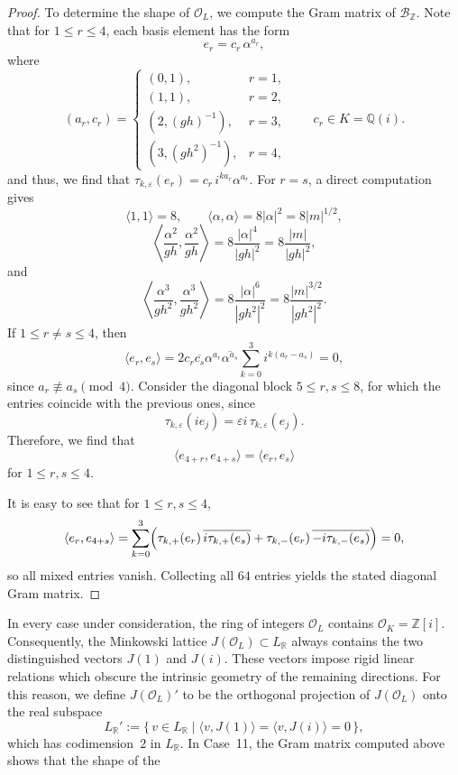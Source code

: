 \documentclass{amsart}
\newcommand{\Q}{\mathbb{Q}}
\newcommand{\R}{\mathbb{R}}
\newcommand{\Z}{\mathbb{Z}}
\newcommand{\cO}{\mathcal{O}}
\theoremstyle{plain}
\theoremstyle{definition}
\theoremstyle{remark}
\numberwithin{equation}{section}
\begin{document}
\begin{proof}
To determine the shape of $\cO_L$, we compute the Gram matrix of $\mathcal B_{\Z}$. Note that for $1\le r\le4$, each basis element has the form
\[
e_r=c_r\,\alpha^{a_r},
\]
where
\[
(a_r,c_r)=
\begin{cases}
(0,1), & r=1,\\
(1,1), & r=2,\\
(2,(gh)^{-1}), & r=3,\\
(3,(gh^2)^{-1}), & r=4,
\end{cases}
\qquad c_r\in K=\Q(i).
\]
and thus, we find that $\tau_{k,\varepsilon}(e_r)
=
c_r\,i^{k a_r}\alpha^{a_r}$. For $r=s$, a direct computation gives
\[
\langle 1,1\rangle=8,
\qquad
\langle \alpha,\alpha\rangle=8|\alpha|^2=8|m|^{1/2},
\]
\[
\left\langle \frac{\alpha^2}{gh},\frac{\alpha^2}{gh}\right\rangle
=
8\frac{|\alpha|^4}{|gh|^2}
=
8\frac{|m|}{|gh|^2},
\]
and
\[
\left\langle \frac{\alpha^3}{gh^2},\frac{\alpha^3}{gh^2}\right\rangle
=
8\frac{|\alpha|^6}{|gh^2|^2}
=
8\frac{|m|^{3/2}}{|gh^2|^2}.
\]
\noindent If $1\le r\neq s\le4$, then
\[
\langle e_r,e_s\rangle
=
2c_r\overline{c_s}\alpha^{a_r}\overline{\alpha^{a_s}}
\sum_{k=0}^3 i^{k(a_r-a_s)}=0,
\]
since $a_r\not\equiv a_s\pmod{4}$. Consider the diagonal block $5\le r,s\le8$, for which the entries coincide with the previous ones, since
\[
\tau_{k,\varepsilon}(ie_j)=\varepsilon i\,\tau_{k,\varepsilon}(e_j).
\]
Therefore, we find that
\[
\langle e_{4+r},e_{4+s}\rangle
=
\langle e_r,e_s\rangle
\]
for $1\le r,s\le4$.
\par It is easy to see that for $1\leq r,s\leq 4$,
\[
\langle e_r,e_{4+s}\rangle
=
\sum_{k=0}^3
\Bigl(
\tau_{k,+}(e_r)\,\overline{i\tau_{k,+}(e_s)}
+
\tau_{k,-}(e_r)\,\overline{-i\tau_{k,-}(e_s)}
\Bigr)
=0,
\]
so all mixed entries vanish. Collecting all $64$ entries yields the stated diagonal Gram matrix.
\end{proof}
\par
In every case under consideration, the ring of integers $\cO_L$ contains
$\cO_K=\Z[i]$. Consequently, the Minkowski lattice $J(\cO_L)\subset L_\R$
always contains the two distinguished vectors $J(1)$ and $J(i)$.
These vectors impose rigid linear relations which obscure the intrinsic
geometry of the remaining directions. For this reason, we define
$J(\cO_L)'$ to be the orthogonal projection of $J(\cO_L)$ onto the real
subspace
\[
L_\R' := \{\, v\in L_\R \mid \langle v, J(1)\rangle = \langle v, J(i)\rangle =0 \,\},
\]
which has codimension~$2$ in $L_\R$. In Case~11, the Gram matrix computed above shows that the shape of the
\end{document}
